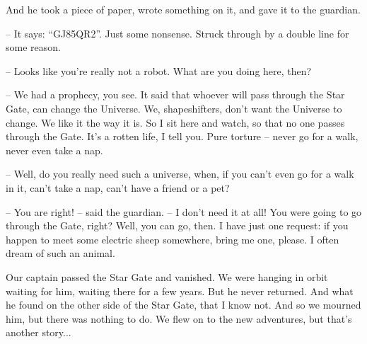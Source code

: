 \documentclass[ebook,twoside,final,openright]{memoir}
\begin{document}
And he took a piece of paper, wrote something on it, and gave it to the guardian.\par
– It says: “GJ85QR2”. Just some nonsense. Struck through by a double line for some reason.\par
– Looks like you're really not a robot. What are you doing here, then?\par
– We had a prophecy, you see. It said that whoever will pass through the Star Gate, can change the Universe. We, shapeshifters, don’t want the Universe to change. We like it the way it is. So I sit here and watch, so that no one passes through the Gate. It’s a rotten life, I tell you. Pure torture – never go for a walk, never even take a nap.\par
– Well, do you really need such a universe, when, if you can’t even go for a walk in it, can’t take a nap, can’t have a friend or a pet?\par
– You are right! – said the guardian. – I don’t need it at all! You were going to go through the Gate, right? Well, you can go, then. I have just one request: if you happen to meet some electric sheep somewhere, bring me one, please. I often dream of such an animal.\par
Our captain passed the Star Gate and vanished. We were hanging in orbit waiting for him, waiting there for a few years. But he never returned. And what he found on the other side of the Star Gate, that I know not. And so we mourned him, but there was nothing to do. We flew on to the new adventures, but that's another story...
\end{document}

